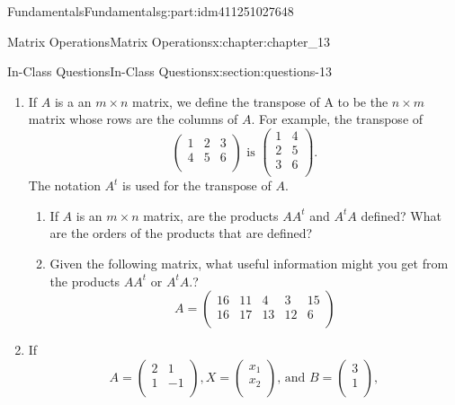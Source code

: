 \documentclass[oneside,10pt,]{book}
\numberwithin{equation}{section}
\begin{document}
\begin{partptx}{Fundamentals}{}{Fundamentals}{}{}{g:part:idm411251027648}
\begin{chapterptx}{Matrix Operations}{}{Matrix Operations}{}{}{x:chapter:chapter_13}
\begin{sectionptx}{In-Class Questions}{}{In-Class Questions}{}{}{x:section:questions-13}
\begin{enumerate}[label=\arabic*.]
\item{}If \(A\) is a an \(m \times n\) matrix, we define the transpose of A to be the \(n \times m\) matrix whose rows are the columns of \(A\).  For example, the transpose of%
\begin{equation*}
\left(
\begin{array}{ccc}
1 &2 &3 \\
4 &5 &6 \\
\end{array}
\right) \textrm{  is  }
\left(
\begin{array}{cc}
1 &4 \\
2 &5 \\
3 &6 \\
\end{array}
\right).
\end{equation*}
The notation \(A^t\) is used for the transpose of \(A\).%
\begin{enumerate}[label=(\alph*)]
\item{}If \(A\) is an \(m \times n\) matrix, are the products \(A A^t\) and \(A^t A \) defined?  What are the orders of the products that are defined?%
\item{}Given the following matrix, what useful information might you get from the products \(A A^t\) or \(A^t A\).?%
\begin{equation*}
A=\left(
\begin{array}{ccccc}
16 &11 &4 &3 &15 \\
16 &17 &13 &12 &6 \\
\end{array}
\right) 
\end{equation*}
%
\end{enumerate}
%
\item{}If%
\begin{equation*}
A =\left(
\begin{array}{cc}
2 & 1 \\
1 & -1 \\
\end{array}
\right), X =\left(
\begin{array}{c}
x_1 \\
x_2 \\
\end{array}
\right)\textrm{, and }B =\left(
\begin{array}{c}
3 \\
1 \\
\end{array}
\right),
\end{equation*}

\end{enumerate}
\end{sectionptx}
\end{chapterptx}
\end{partptx}
\end{document}
